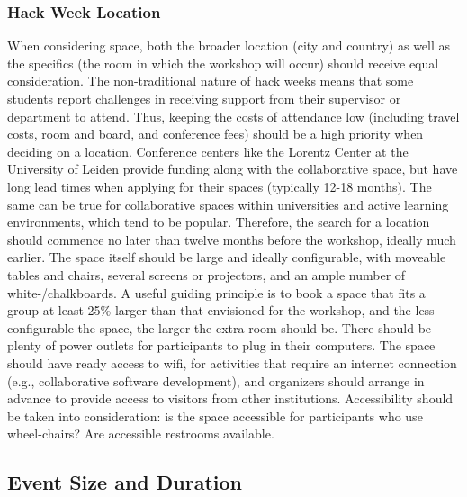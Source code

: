\subsubsection{Hack Week Location}
When considering space, both the broader location (city and country) as well as the specifics (the room in which the workshop will occur) should receive equal consideration. The non-traditional nature of hack weeks means that some students report challenges in receiving support from their supervisor or department to attend. Thus, keeping the costs of attendance low (including travel costs, room and board, and conference fees) should be a high priority when deciding on a location. Conference centers like the Lorentz Center at the University of Leiden provide funding along with the collaborative space, but have long lead times when applying for their spaces (typically 12-18 months). The same can be true for collaborative spaces within universities and active learning environments, which tend to be popular. Therefore, the search for a location should commence no later than twelve months before the workshop, ideally much earlier.
The space itself should be large and ideally configurable, with moveable tables and chairs, several screens or projectors, and an ample number of white-/chalkboards. A useful guiding principle is to book a space that fits a group at least 25\% larger than that envisioned for the workshop, and the less configurable the space, the larger the extra room should be.
There should be plenty of power outlets for participants to plug in their computers.
The space should have ready access to wifi, for activities that require an internet connection (e.g., collaborative software development), and organizers should arrange in advance to provide access to visitors from other institutions.
Accessibility should be taken into consideration: is the space accessible for participants who use wheel-chairs? Are accessible restrooms available.

\subsection{Event Size and Duration}

